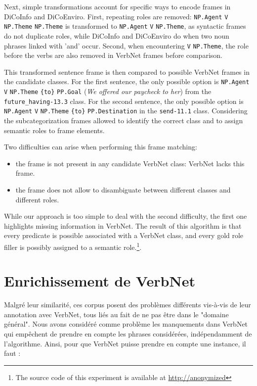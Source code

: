 Next, simple transformations account for specific ways to encode frames in
DiCoInfo and DiCoEnviro. First, repeating roles are removed: \texttt{NP.Agent}
\texttt{V} \texttt{NP.Theme} \texttt{NP.Theme} is transformed to
\texttt{NP.Agent} \texttt{V} \texttt{NP.Theme}, as syntactic frames do not
duplicate roles, while DiCoInfo and DiCoEnviro do when two noun phrases linked
with 'and' occur. Second, when encountering \texttt{V} \texttt{NP.Theme}, the
role before the verbs are also removed in VerbNet frames before comparison.

This transformed sentence frame is then compared to possible VerbNet frames in
the candidate classes. For the first sentence, the only possible option is
\texttt{NP.Agent} \texttt{V} \texttt{NP.Theme} \texttt{\{to\}} \texttt{PP.Goal}
(\textit{We offered our paycheck to her}) from the \texttt{future\_having-13.3}
class. For the second sentence, the only possible option is \texttt{NP.Agent}
\texttt{V} \texttt{NP.Theme} \texttt{\{to\}} \texttt{PP.Destination} in the
\texttt{send-11.1} class. Considering the subcategorization frames allowed to
identify the correct class and to assign semantic roles to frame elements.

Two difficulties can arise when performing this frame matching:
\begin{itemize}
    \item the frame is not present in any candidate VerbNet class: VerbNet lacks this frame.
    \item the frame does not allow to disambiguate between different classes and different roles.
\end{itemize}

While our approach is too simple to deal with the second difficulty, the first
one highlights missing information in VerbNet. The result of this algorithm is
that every predicate is possible associated with a VerbNet class, and every
gold role filler is possibly assigned to a semantic role.\footnote{The source
code of this experiment is available at \url{http://anonymized}}.

\section{Enrichissement de VerbNet}

Malgré leur similarité, ces corpus posent des problèmes différents vis-à-vis de
leur annotation avec VerbNet, tous liés au fait de ne pas être dans le "domaine
général". Nous avons considéré comme problème les manquements dans VerbNet qui
empêchent de prendre en compte les phrases considérées, indépendamment de
l'algorithme. Ainsi, pour que VerbNet puisse prendre en compte une instance, il
faut :

